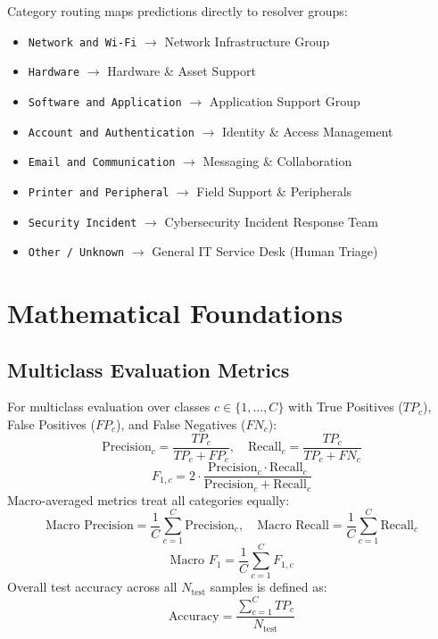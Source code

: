 \documentclass[conference]{IEEEtran}
\begin{document}
Category routing maps predictions directly to resolver groups:
\begin{itemize}
    \item \texttt{Network and Wi-Fi} $\rightarrow$ Network Infrastructure Group
    \item \texttt{Hardware} $\rightarrow$ Hardware \& Asset Support
    \item \texttt{Software and Application} $\rightarrow$ Application Support Group
    \item \texttt{Account and Authentication} $\rightarrow$ Identity \& Access Management
    \item \texttt{Email and Communication} $\rightarrow$ Messaging \& Collaboration
    \item \texttt{Printer and Peripheral} $\rightarrow$ Field Support \& Peripherals
    \item \texttt{Security Incident} $\rightarrow$ Cybersecurity Incident Response Team
    \item \texttt{Other / Unknown} $\rightarrow$ General IT Service Desk (Human Triage)
\end{itemize}

\section{Mathematical Foundations}

\subsection{Multiclass Evaluation Metrics}
For multiclass evaluation over classes $c \in \{1, \dots, C\}$ with True Positives ($TP_c$), False Positives ($FP_c$), and False Negatives ($FN_c$):
\begin{equation}
\text{Precision}_c = \frac{TP_c}{TP_c + FP_c}, \quad \text{Recall}_c = \frac{TP_c}{TP_c + FN_c}
\end{equation}
\begin{equation}
F_{1, c} = 2 \cdot \frac{\text{Precision}_c \cdot \text{Recall}_c}{\text{Precision}_c + \text{Recall}_c}
\end{equation}
Macro-averaged metrics treat all categories equally:
\begin{equation}
\text{Macro Precision} = \frac{1}{C} \sum_{c=1}^C \text{Precision}_c, \quad \text{Macro Recall} = \frac{1}{C} \sum_{c=1}^C \text{Recall}_c
\end{equation}
\begin{equation}
\text{Macro } F_1 = \frac{1}{C} \sum_{c=1}^C F_{1, c}
\end{equation}
Overall test accuracy across all $N_{\text{test}}$ samples is defined as:
\begin{equation}
\text{Accuracy} = \frac{\sum_{c=1}^C TP_c}{N_{\text{test}}}
\end{equation}
\end{document}
